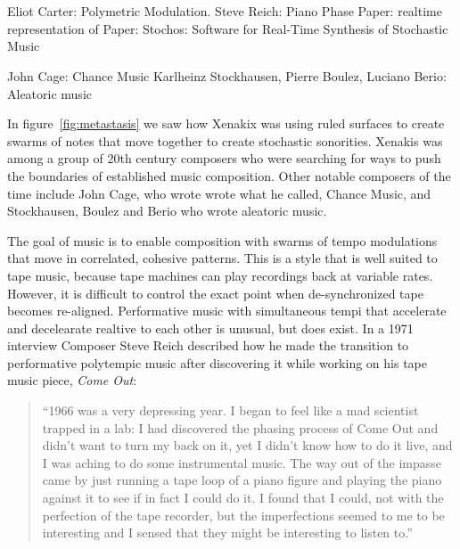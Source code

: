 
\chapter{\polytempic}
\label{ch:polytempic}

Eliot Carter: Polymetric Modulation. 
Steve Reich: Piano Phase
Paper: realtime representation of 
Paper: Stochos: Software for Real-Time Synthesis of Stochastic Music

John Cage: Chance Music
Karlheinz Stockhausen, Pierre Boulez, Luciano Berio: Aleatoric music

In figure~\ref{fig:metastasis} we saw how Xenakix was using ruled surfaces to create
swarms of notes that move together to create stochastic
sonorities. Xenakis was among a group of 20th century composers who
were searching for ways to push the boundaries of established music
composition. Other notable composers of the time include John Cage,
who wrote wrote what he called, Chance Music, and  Stockhausen, Boulez
and Berio who wrote aleatoric music. 

The goal of \polytempic music is to enable composition with swarms of
tempo modulations that move in correlated, cohesive patterns. This is
a style that is well suited to tape music, because tape machines can
play recordings back at variable rates. However, it is difficult to
control the exact point when de-synchronized tape becomes
re-aligned. Performative music with simultaneous tempi that accelerate
and decelearate realtive to each other is unusual, but does
exist. In a 1971 interview Composer Steve Reich described how he made
the transition to performative polytempic music after discovering it
while working on his tape music piece, \textit{Come Out}:
\begin{quotation}
  ``1966 was a very depressing year. I began to feel like a mad
  scientist trapped in a lab: I had discovered the phasing process
  of Come Out and didn't want to turn my back on it, yet I didn't know
  how to do it live, and I was aching to do some instrumental
  music. The way out of the impasse came by just running a tape loop
  of a piano figure and playing the piano against it to see if in fact
  I could do it. I found that I could, not with the perfection of the
  tape recorder, but the imperfections seemed to me to be interesting
  and I sensed that they might be interesting to listen to.''\cite{Nyman2015}
\end{quotation}



